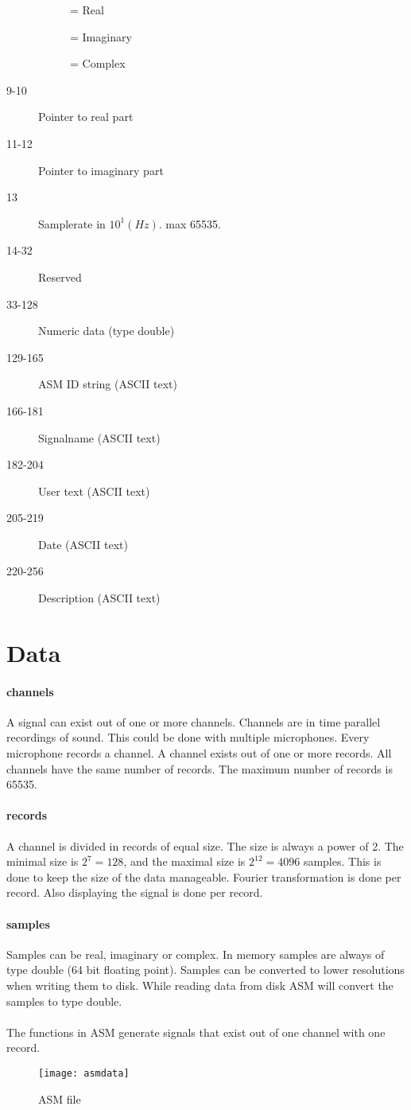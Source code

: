 \documentclass{report}
\begin{document}
\begin{description}
\begin{description}
             \item[]   = Real
			 \item[]   = Imaginary
			 \item[]   = Complex
	     \end{description}
\item[9-10] Pointer to real part
\item[11-12] Pointer to imaginary part
\item[13] Samplerate in $10^{1} (Hz)$. max 65535.
\item[14-32] Reserved
\item[33-128] Numeric data (type double)
\item[129-165] ASM ID string (ASCII text)
\item[166-181] Signalname (ASCII text)
\item[182-204] User text (ASCII text)
\item[205-219] Date (ASCII text)
\item[220-256] Description (ASCII text)
\end{description}

\section{Data}

\paragraph{channels}
A signal can exist out of one or more channels. Channels
are in time parallel recordings of sound. This could be
done with multiple microphones. Every microphone records
a channel. A channel exists out of one or more records.
All channels have the same number of records. The maximum
number of records is 65535.

\paragraph{records}
A channel is divided in records of equal size. The size is always
a power of 2. The minimal size is $2^{7}=128$, and the
maximal size is $2^{12}=4096$ samples. This is done to
keep the size of the data manageable. Fourier transformation is
done per record. Also displaying the signal is done per record.

\paragraph{samples}
Samples can be real, imaginary or complex. In memory samples
are always of type double (64 bit floating point). Samples
can be converted to lower resolutions when writing them to disk.
While reading data from disk ASM will convert the samples to
type double.

\paragraph{}
The functions in ASM generate signals that exist out of one channel
with one record.

\begin{figure}[h]
\centerline{\texttt{[image: asmdata]}}
\caption{ASM file}
\label{fig:asmfile}
\end{figure}
\end{document}
